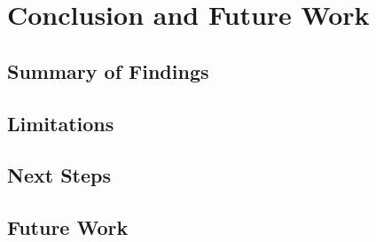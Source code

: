 
\chapter{Conclusion and Future Work} %
\label{chap:summary}

\section{Summary of Findings}

\section{Limitations}

\section{Next Steps}

\section{Future Work}
